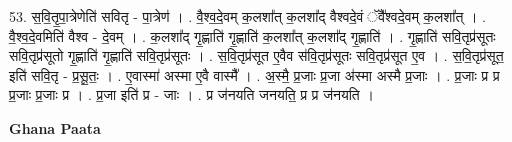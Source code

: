 \documentclass[17pt]{extarticle}
\begin{document}
53. स॒वि॒तृ॒पा॒त्रेणेति॑ सवितृ - पा॒त्रेण॑ । . वै॒श्व॒दे॒वम् क॒लशा᳚त् क॒लशा᳚द् वैश्वदे॒वं ॅवै᳚श्वदे॒वम् क॒लशा᳚त् । . वै॒श्व॒दे॒वमिति॑ वैश्व - दे॒वम् । . क॒लशा᳚द् गृ॒ह्णाति॑ गृ॒ह्णाति॑ क॒लशा᳚त् क॒लशा᳚द् गृ॒ह्णाति॑ । . गृ॒ह्णाति॑ सवि॒तृप्र॑सूतः सवि॒तृप्र॑सूतो गृ॒ह्णाति॑ गृ॒ह्णाति॑ सवि॒तृप्र॑सूतः । . स॒वि॒तृप्र॑सूत ए॒वैव स॑वि॒तृप्र॑सूतः सवि॒तृप्र॑सूत ए॒व । . स॒वि॒तृप्र॑सूत॒ इति॑ सवि॒तृ - प्र॒सू॒तः॒ । . ए॒वास्मा॑ अस्मा ए॒वै वास्मै᳚ । . अ॒स्मै॒ प्र॒जाः प्र॒जा अ॑स्मा अस्मै प्र॒जाः । . प्र॒जाः प्र प्र प्र॒जाः प्र॒जाः प्र । . प्र॒जा इति॑ प्र - जाः । . प्र ज॑नयति जनयति॒ प्र प्र ज॑नयति । \newline

\textbf{Ghana Paata } \newline
\end{document}
